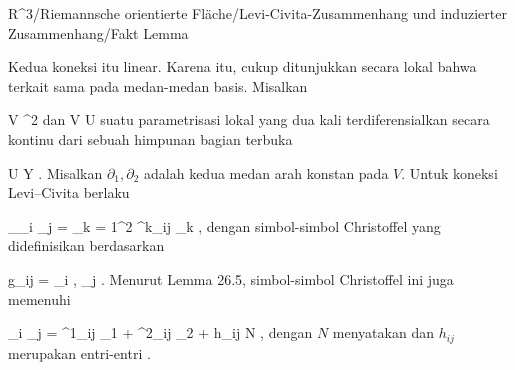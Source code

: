 {R^3/Riemannsche orientierte Fläche/Levi-Civita-Zusammenhang und induzierter Zusammenhang/Fakt}
{Lemma}
{}
{

\faktzusatz {}
\faktzusatz {}

}
{

Kedua koneksi itu linear. Karena itu, cukup ditunjukkan secara lokal bahwa
terkait sama pada medan-medan basis. Misalkan

\mavergleichskette
{\vergleichskette
{ V
}
{ \subseteq }{ \R^2
}
{  }{
}
{    }{
}
{   }{
}
}
{}{}{}
dan
\maabbdisp {\varphi} { V } { U
} {}
suatu parametrisasi lokal yang dua kali terdiferensialkan secara kontinu dari sebuah himpunan bagian terbuka

\mavergleichskette
{\vergleichskette
{ U
}
{ \subseteq }{ Y
}
{  }{
}
{    }{
}
{   }{
}
}
{}{}{.}
Misalkan $\partial_1,\partial_2$ adalah kedua medan arah konstan pada $V$. Untuk koneksi Levi--Civita berlaku

\mavergleichskettedisp
{\vergleichskette
{ \nabla_{\partial_i } \partial_j
}
{ =} { \sum_{k = 1}^2  \Gamma^k_{ij} \partial_k
}
{ } {
}
{ } {
}
{ } {
}
}
{}{}{,}
dengan simbol-simbol Christoffel yang didefinisikan berdasarkan

\mavergleichskettedisp
{\vergleichskette
{ g_{ij}
}
{ =} { \left\langle  \partial_i \varphi ,  \partial_j \varphi  \right\rangle
}
{ } {
}
{ } {
}
{ } {
}
}
{}{}{.}
Menurut
Lemma 26.5,
simbol-simbol Christoffel ini juga memenuhi

\mavergleichskettedisp
{\vergleichskette
{ \partial_i \partial_j \varphi
}
{ =} { \Gamma^1_{ij} \partial_1  \varphi +  \Gamma^2_{ij}  \partial_2  \varphi+   h_{ij} N
}
{ } {
}
{ } {
}
{ } {
}
}
{}{}{,}
dengan $N$ menyatakan
dan $h_{ij}$ merupakan entri-entri
 {} {.}

}
